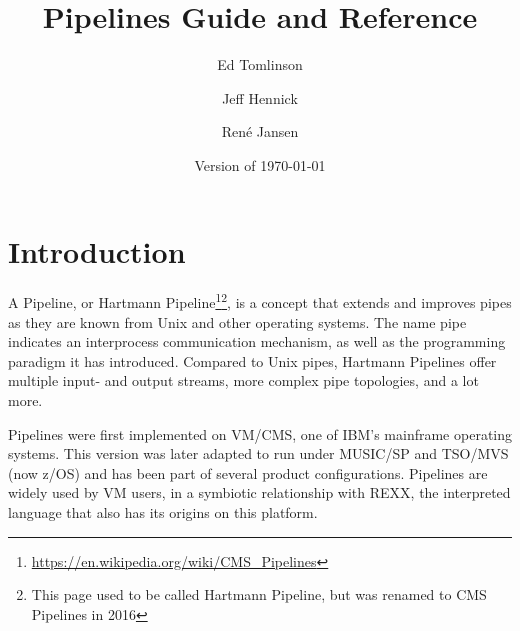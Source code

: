 

\renewcommand{\isbn}{978-90-819090-3-7}    
\setcounter{tocdepth}{1} 
\title{Pipelines Guide and Reference}
\author{Ed Tomlinson \and Jeff Hennick \and René Jansen}
\date{\null\hfill Version  of \today}
\maketitle
{}
\pagestyle{plain}
\frontmatter
{}

\pagestyle{plain}

\tableofcontents
\newpage
{}
\frontmatter
\large

%
\mainmatter%
\lstset{showstringspaces=false}
\lstset{keepspaces=true}




\chapter{Introduction}
A Pipeline, or Hartmann
Pipeline\footnote{\url{https://en.wikipedia.org/wiki/CMS_Pipelines}}\footnote{This
  page used to be called Hartmann Pipeline, but was renamed to CMS Pipelines
  in 2016}, is a concept that extends and improves pipes as they are known from Unix and other operating systems.
The name pipe indicates an interprocess communication mechanism, as well as the programming paradigm it has introduced. Compared to Unix pipes, Hartmann Pipelines offer multiple input- and output streams, more complex pipe topologies, and a lot more.

Pipelines were first implemented on VM/CMS, one of IBM's mainframe
operating systems. This version was later adapted to run under
MUSIC/SP and TSO/MVS (now z/OS) and has been part of several product configurations. Pipelines are
widely used by VM users, in a symbiotic relationship with REXX, the
interpreted language that also has its origins on this platform.

